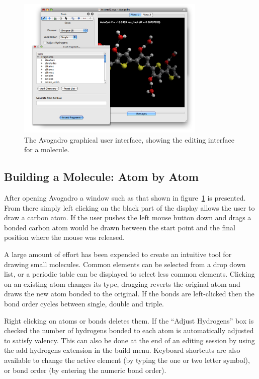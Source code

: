 \documentclass{article}
\begin{document}
\begin{figure}
  \begin{center}
    \includegraphics[width=0.8\textwidth]{images/avogadro-drawing}
  \end{center}
  \caption{The Avogadro graphical user interface, showing the editing interface for a molecule.}
  \label{f:avogadrogui}
\end{figure}


\subsection{Building a Molecule: Atom by Atom}

After opening Avogadro a window such as that shown in figure~\ref{f:avogadrogui} is presented. From there simply left clicking on the black part of the display allows the user to draw a carbon atom. If the user pushes the left mouse button down and drags a bonded carbon atom would be drawn between the start point and the final position where the mouse was released.

A large amount of effort has been expended to create an intuitive tool for drawing small molecules. Common elements can be selected from a drop down list, or a periodic table can be displayed to select less common elements. Clicking on an existing atom changes its type, dragging reverts the original atom and draws the new atom bonded to the original. If the bonds are left-clicked then the bond order cycles between single, double and triple.

Right clicking on atoms or bonds deletes them. If the ``Adjust Hydrogens'' box is checked the number of hydrogens bonded to each atom is automatically adjusted to satisfy valency. This can also be done at the end of an editing session by using the add hydrogens extension in the build menu. Keyboard shortcuts are also available to change the active element (by typing the one or two letter symbol), or bond order (by entering the numeric bond order).
\end{document}
